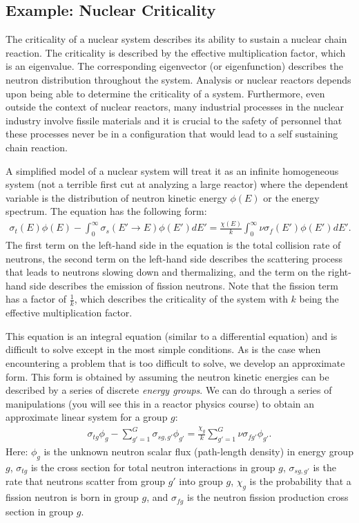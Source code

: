 \subsection{Example: Nuclear Criticality}

The criticality of a nuclear system describes its ability to sustain a nuclear chain reaction. The criticality is described by the effective multiplication factor, which is an eigenvalue. The corresponding eigenvector (or eigenfunction) describes the neutron distribution throughout the system. Analysis or nuclear reactors depends upon being able to determine the criticality of a system. Furthermore, even outside the context of nuclear reactors, many industrial processes in the nuclear industry involve fissile materials and it is crucial to the safety of personnel that these processes never be in a configuration that would lead to a self sustaining chain reaction.

A simplified model of a nuclear system will treat it as an infinite homogeneous system (not a terrible first cut at analyzing a large reactor) where the dependent variable is the distribution of neutron kinetic energy $\phi(E)$ or the energy spectrum. The equation has the following form:
\begin{align}
  \sigma_t(E) \phi(E) - \int_0^\infty \sigma_s(E' \rightarrow E) \phi(E') dE' = \frac{\chi(E)}{k} \int_0^\infty \nu \sigma_f(E') \phi(E') dE'.
\end{align}
The first term on the left-hand side in the equation is the total collision rate of neutrons, the second term on the left-hand side describes the scattering process that leads to neutrons slowing down and thermalizing, and the term on the right-hand side describes the emission of fission neutrons. Note that the fission term has a factor of $\frac{1}{k}$, which describes the criticality of the system with $k$ being the effective multiplication factor. 

This equation is an integral equation (similar to a differential equation) and is difficult to solve except in the most simple conditions. As is the case when encountering a problem that is too difficult to solve, we develop an approximate form. This form is obtained by assuming the neutron kinetic energies can be described by a series of discrete \emph{energy groups}. We can do through a series of manipulations (you will see this in a reactor physics course) to obtain an approximate linear system for a group $g$:
\begin{align}
  \sigma_{tg} \phi_g - \sum_{g'=1}^G \sigma_{sg,g'} \phi_{g'} = \frac{\chi_g}{k} \sum_{g'=1}^G \nu \sigma_{fg'} \phi_{g'}.
\end{align}
Here: $\phi_g$ is the unknown neutron scalar flux (path-length density) in energy group $g$, $\sigma_{tg}$ is the cross section for total neutron interactions in group $g$, $\sigma_{sg,g'}$ is the rate that neutrons scatter from group $g'$ into group $g$, $\chi_g$ is the probability that a fission neutron is born in group $g$, and $\sigma_{fg}$ is the neutron fission production cross section in group $g$.

